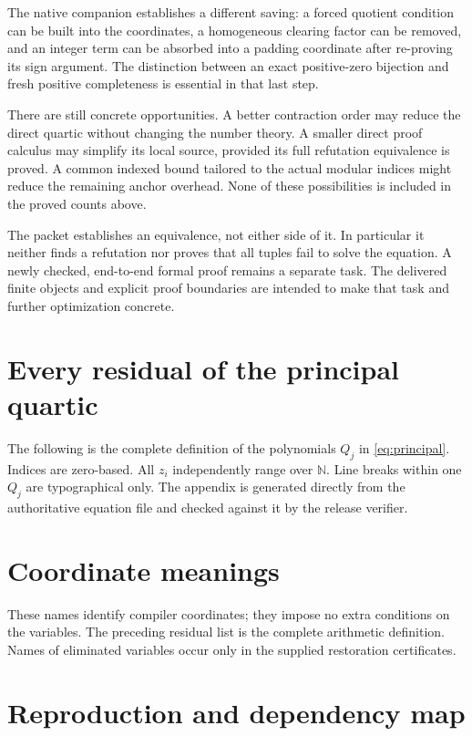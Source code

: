 \documentclass[11pt,letterpaper]{article}
\newcommand{\N}{\mathbb N}
\theoremstyle{remark}\newtheorem{remark}[theorem]{Remark}
\begin{document}
The native companion establishes a different saving: a forced quotient
condition can be built into the coordinates, a homogeneous clearing
factor can be removed, and an integer term can be absorbed into a padding
coordinate after re-proving its sign argument.  The distinction between
an exact positive-zero bijection and fresh positive completeness is
essential in that last step.

There are still concrete opportunities.  A better contraction order may
reduce the direct quartic without changing the number theory.  A smaller
direct proof calculus may simplify its local source, provided its full
refutation equivalence is proved.  A common indexed bound tailored to the
actual modular indices might reduce the remaining anchor overhead.
None of these possibilities is included in the proved counts above.

The packet establishes an equivalence, not either side of it.  In
particular it neither finds a refutation nor proves that all tuples fail
to solve the equation.  A newly checked, end-to-end formal proof remains
a separate task.  The delivered finite objects and explicit proof
boundaries are intended to make that task and further optimization
concrete.

\appendix
\section{Every residual of the principal quartic}\label{app:residuals}

The following is the complete definition of the polynomials $Q_j$ in
\eqref{eq:principal}.  Indices are zero-based.  All $z_i$ independently
range over $\N$.  Line breaks within one $Q_j$ are typographical only.
The appendix is generated directly from the authoritative equation file
and checked against it by the release verifier.


\section{Coordinate meanings}

These names identify compiler coordinates; they impose no extra conditions
on the variables.  The preceding residual list is the complete arithmetic
definition.  Names of eliminated variables occur only in the supplied
restoration certificates.


\section{Reproduction and dependency map}
\end{document}
